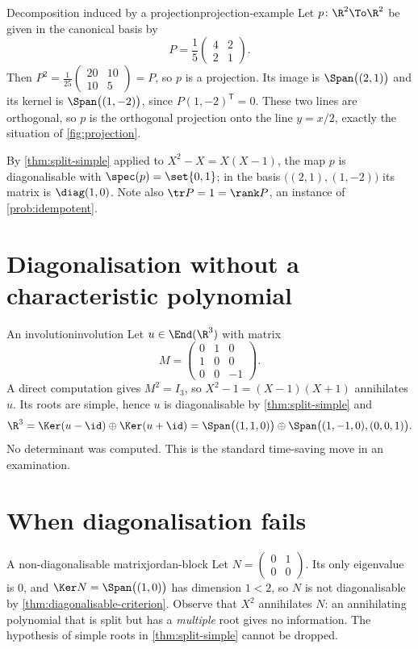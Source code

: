 \begin{example}{Decomposition induced by a projection}{projection-example}
Let $p\colon\R^{2}\To\R^{2}$ be given in the canonical basis by
\[
  P=\frac{1}{5}\begin{pmatrix} 4 & 2\\ 2 & 1\end{pmatrix}.
\]
Then $P^{2}=\frac{1}{25}\begin{pmatrix}20&10\\10&5\end{pmatrix}=P$, so $p$ is a
projection. Its image is $\Span\bigl((2,1)\bigr)$ and its kernel is
$\Span\bigl((1,-2)\bigr)$, since $P(1,-2)^{\mathsf{T}}=0$. These two lines are
orthogonal, so $p$ is the orthogonal projection onto the line $y=x/2$, exactly
the situation of \cref{fig:projection}.

By \cref{thm:split-simple} applied to $X^{2}-X=X(X-1)$, the map $p$ is
diagonalisable with $\spec(p)=\set{0,1}$; in the basis $\bigl((2,1),(1,-2)\bigr)$
its matrix is $\diag(1,0)$. Note also $\tr P=1=\rank P$, an instance of
\cref{prob:idempotent}.
\end{example}

\section{Diagonalisation without a characteristic polynomial}

\begin{example}{An involution}{involution}
Let $u\in\End(\R^{3})$ with matrix
\[
  M=\begin{pmatrix} 0 & 1 & 0\\ 1 & 0 & 0\\ 0 & 0 & -1\end{pmatrix}.
\]
A direct computation gives $M^{2}=I_3$, so $X^{2}-1=(X-1)(X+1)$ annihilates $u$.
Its roots are simple, hence $u$ is diagonalisable by \cref{thm:split-simple} and
\[
  \R^{3}=\Ker(u-\id)\oplus\Ker(u+\id)
        =\Span\bigl((1,1,0)\bigr)\oplus\Span\bigl((1,-1,0),(0,0,1)\bigr).
\]
No determinant was computed. This is the standard time-saving move in an
examination.
\end{example}

\section{When diagonalisation fails}

\begin{example}{A non-diagonalisable matrix}{jordan-block}
Let $N=\begin{pmatrix}0&1\\0&0\end{pmatrix}$. Its only eigenvalue is $0$, and
$\Ker N=\Span\bigl((1,0)\bigr)$ has dimension $1<2$, so $N$ is not
diagonalisable by \cref{thm:diagonalisable-criterion}. Observe that $X^{2}$
annihilates $N$: an annihilating polynomial that is split but has a
\emph{multiple} root gives no information. The hypothesis of simple roots in
\cref{thm:split-simple} cannot be dropped.
\end{example}

